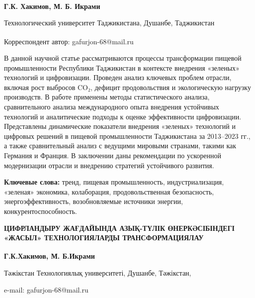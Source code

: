 
\begin{articleheader}

{\bfseries
Г.К. Хакимов\textsuperscript{\envelope },
М. Б. Икрами
}
\end{articleheader}

\begin{affiliation}
Технологический университет Таджикистана, Душанбе, Таджикистан

\raggedright \textsuperscript{\envelope }Корреспондент автор: gafurjon-68@mail.ru
\end{affiliation}

В данной научной статье рассматриваются процессы трансформации пищевой
промышленности Республики Таджикистан в контексте внедрения «зеленых»
технологий и цифровизации. Проведен анализ ключевых проблем отрасли,
включая рост выбросов CO₂, дефицит продовольствия и экологическую
нагрузку производств. В работе применены методы статистического анализа,
сравнительного анализа международного опыта внедрения устойчивых
технологий и аналитические подходы к оценке эффективности цифровизации.
Представлены динамические показатели внедрения «зеленых» технологий и
цифровых решений в пищевой промышленности Таджикистана за 2013--2023
гг., а также сравнительный анализ с ведущими мировыми странами, такими
как Германия и Франция. В заключении даны рекомендации по ускоренной
модернизации отрасли и внедрению стратегий устойчивого развития.

{\bfseries Ключевые слова:} тренд, пищевая промышленность,
индустриализация, «зеленая» экономика, колаборация, продовольственная
безопасность, энергоэффективность, возобновляемые источники энергии,
конкурентоспособность.

\begin{articleheader}
{\bfseries ЦИФРЛАНДЫРУ ЖАҒДАЙЫНДА АЗЫҚ-ТҮЛІК ӨНЕРКӘСІБІНДЕГІ «ЖАСЫЛ» ТЕХНОЛОГИЯЛАРДЫ ТРАНСФОРМАЦИЯЛАУ}

{\bfseries
Г.К.Хакимов\textsuperscript{\envelope },
М. Б.Икрами
}
\end{articleheader}

\begin{affiliation}
Тәжікстан Технологиялық университеті, Душанбе, Тәжікстан,

e-mail: gafurjon-68@mail.ru
\end{affiliation}

